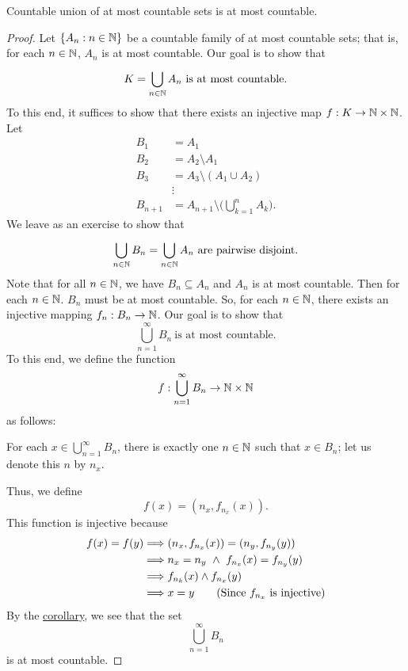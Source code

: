 \documentclass[a4paper]{report}
\begin{document}
\begin{theorem}[ ]\label{Countable union of at most countable sets is at most countable}
   Countable union of at most countable sets is at most countable.
\end{theorem}
\begin{proof}
    Let \( \{ {A}_{n} : n \in \mathbb{N}  \} \) be a countable family of at most countable sets; that is, for each \( n \in \mathbb{N}  \), \( {A}_{n} \) is at most countable. Our goal is to show that 
    \[  K = \bigcup_{ n \in \N  }^{  }  {A}_{n} \ \text{is at most countable.} \]
    To this end, it suffices to show that there exists an injective map \( f: K \to \mathbb{N} \times \mathbb{N}  \). Let 
    \begin{align*}
        {B}_{1} &= {A}_{1} \\
        {B}_{2} &= {A}_{2} \setminus  {A}_{1} \\
        {B}_{3} &= {A}_{3} \setminus  ({A}_{1} \cup {A}_{2}) \\
                &\vdots \\
        {B}_{n+1} &= {A}_{n+1} \setminus  \Big(  \bigcup_{ k=1  }^{ n }  {A}_{k} \Big).
    \end{align*}
    We leave as an exercise to show that 
        \[  \bigcup_{ n \in \mathbb{N}  }^{   }  {B}_{n} = \bigcup_{ n \in \mathbb{N}  }^{  }  {A}_{n} \ \text{are pairwise disjoint}. \]
       Note that for all \( n \in \mathbb{N}  \), we have \( {B}_{n} \subseteq  {A}_{n} \) and \( {A}_{n}  \) is at most countable. Then for each \( n \in \mathbb{N}  \). \( {B}_{n} \) must be at most countable. So, for each \( n \in \mathbb{N}  \), there exists an injective mapping \( {f}_{n}: {B}_{n} \to \mathbb{N} \). Our goal is to show that  
       \[  \bigcup_{ n =1  }^{ \infty  } {B}_{n} \ \text{is at most countable}. \]
       To this end, we define the function 
       \[  f: \bigcup_{ n=1  }^{ \infty  }  {B}_{n} \to \mathbb{N} \times \mathbb{N} \]
       as follows:
       \begin{center}
           For each \( x \in \bigcup_{ n = 1  }^{ \infty  } {B}_{n} \), there is exactly one \( n \in \mathbb{N}  \) such that \( x \in {B}_{n} \); let us denote this \( n  \) by \( {n}_{x} \).  
       \end{center}
       Thus, we define 
       \[  f(x) = ({n}_{x}, {f}_{{n}_{x}}(x)). \]
       This function is injective because
       \begin{align*}
           f(x) = f(y) &\Longrightarrow ({n}_{x}, {f}_{{n}_{x}}(x)) = ({n}_{y}, {f}_{{n}_{y}}(y)) \\
                       &\Longrightarrow {n}_{x} = {n}_{y} \ \wedge \ {f}_{{n}_{x}}(x) = {f}_{{n}_{y}}(y) \\
                       &\Longrightarrow {f}_{{n}_{k}}(x) \wedge {f}_{{n}_{x}}(y) \\
                       &\Longrightarrow x =y \tag{Since \( {f}_{{n}_{x}}  \) is injective}
       \end{align*}
       By the {\hyperref[Injective mapping implies at most countability]{corollary}}, we see that the set 
       \[  \bigcup_{ n =1  }^{  \infty  }  {B}_{n} \] is at most countable.
\end{proof}
\end{document}
